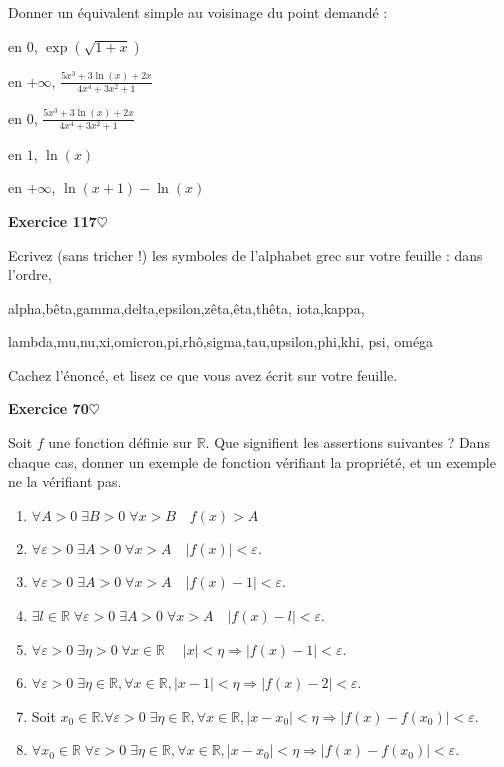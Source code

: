 ﻿\documentclass[11pt,a4paper]{amsart}
\theoremstyle{theorem}
\theoremstyle{definition}
\newcommand{\coeur}{$\heartsuit$}
\newcommand{\eps}{\varepsilon}
\def\RR{{\mathbb R}}
\newcounter{qcounter}
\newcounter{qscounter}
\begin{document}
Donner un équivalent simple au voisinage du point demandé :

\begin{enumerate}[a)]
\begin{multicols}{2}
\item en $0$, $\exp(\sqrt{1+x})$
\item en $+\infty$, $\frac{5x^3+3\ln(x)+2x}{4x^4+3x^2+1}$
\item en $0$,  $\frac{5x^3+3\ln(x)+2x}{4x^4+3x^2+1}$
\item en $1$, $\ln(x)$
\item en $+\infty$, $\ln(x+1)-\ln(x)$
\end{multicols}
\end{enumerate}


\setcounter{qcounter}{0} \setcounter{qscounter}{0}\textbf{Exercice 117}{\coeur}

\question Ecrivez (sans tricher !) les symboles de l'alphabet grec sur votre feuille : dans l'ordre,

{alpha},{bêta},{gamma},{delta},{epsilon},{zêta},{êta},{thêta},
{iota},kappa,

lambda,mu,nu,xi,omicron,pi,rhô,sigma,tau,upsilon,phi,khi,
psi,
oméga

\question Cachez l'énoncé, et lisez ce que vous avez écrit sur votre feuille.


\setcounter{qcounter}{0} \setcounter{qscounter}{0}\textbf{Exercice 70}{\coeur}

Soit $f$ une fonction définie sur $\RR$. Que signifient les assertions suivantes ? Dans chaque cas, donner un exemple de fonction vérifiant la propriété, et un exemple ne la vérifiant pas.

\begin{enumerate}
\item $\forall A>0\; \exists B>0 \;\forall x>B\quad f(x)>A$
\item $\forall \eps>0\; \exists A>0\;\forall x>A\quad |f(x)|<\eps$.
\item $\forall \eps>0\;\exists A>0\;\forall x>A\quad |f(x)-1|<\eps$.
\item $\exists l \in \RR \; \forall \eps>0\;\exists A>0\;\forall x>A\quad |f(x)-l|<\eps$.
\item $\forall \eps>0 \; \exists \eta >0 \; \forall x\in\RR \; \quad |x|<\eta \Rightarrow |f(x)-1|<\eps$.
\item $\forall \eps >0 \; \exists \eta \in \RR, \forall x \in \RR, |x-1|<\eta \Rightarrow |f(x)- 2|< \eps$.
\item Soit $ x_0 \in \RR. \forall \eps >0 \; \exists \eta \in \RR, \forall x \in \RR, |x-x_0|<\eta \Rightarrow |f(x)-f(x_0)|< \eps$.
\item $\forall x_0 \in \RR \; \forall \eps >0 \; \exists \eta \in \RR, \forall x \in \RR, |x-x_0|<\eta \Rightarrow |f(x)-f(x_0)|< \eps$.
\end{enumerate}
\end{document}
